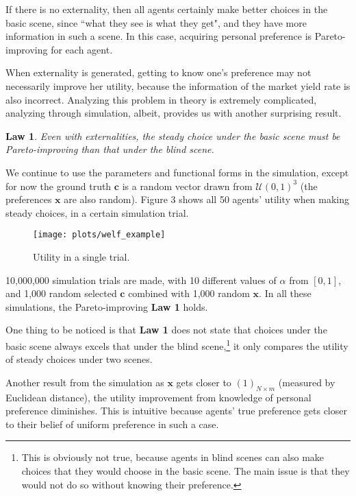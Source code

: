 \documentclass[12pt,english]{article}
\theoremstyle{plain}
\theoremstyle{plain}
\newtheorem{law}{Law}
\begin{document}
	If there is no externality, then all agents certainly make better choices in the basic scene, since ``what they see is what they get", and they have more information in such a scene. In this case, acquiring personal preference is Pareto-improving for each agent. \par 
	When externality is generated, getting to know one's preference may not necessarily improve her utility, because the information of the market yield rate is also incorrect. Analyzing this problem in theory is extremely complicated, analyzing through simulation, albeit, provides us with another surprising result.
	\begin{law}
		Even with externalities, the steady choice under the basic scene must be Pareto-improving than that under the blind scene.
	\end{law}
	
	We continue to use the parameters and functional forms in the simulation, except for now the ground truth $\mathbf{c}$ is a random vector drawn from $\mathcal{U}(0, 1)^3$ (the preferences $\mathbf{x}$ are also random). Figure 3 shows all 50 agents' utility when making steady choices, in a certain simulation trial.
	
	\begin{figure}[h]
		\centering
		\texttt{[image: plots/welf\_example]}
		\caption{Utility in a single trial.}
		\label{fig:welf_example}
	\end{figure}
	
	10,000,000 simulation trials are made, with 10 different values of $\alpha$ from $[0, 1]$, and 1,000 random selected $\mathbf{c}$ combined with 1,000 random $\mathbf{x}$. In all these simulations, the Pareto-improving \textbf{Law 1} holds.\par
	
	One thing to be noticed is that \textbf{Law 1} does not state that choices under the basic scene always excels that under the blind scene,\footnote{This is obviously not true, because agents in blind scenes can also make choices that they would choose in the basic scene. The main issue is that they would not do so without knowing their preference.} it only compares the utility of steady choices under two scenes.\par
	Another result from the simulation as $\mathbf{x}$ gets closer to $(1)_{N\times m}$ (measured by Euclidean distance), the utility improvement from knowledge of personal preference diminishes. This is intuitive because agents' true preference gets closer to their belief of uniform preference in such a case.\par 
	
\end{document}
